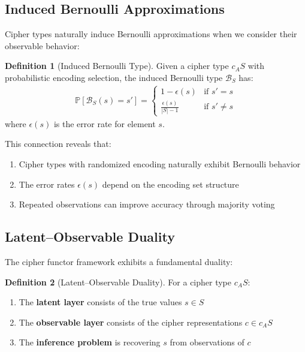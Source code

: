 \documentclass[11pt]{article}
\theoremstyle{definition}
\newtheorem{definition}{Definition}[section]
\theoremstyle{plain}
\theoremstyle{remark}
\newcommand{\cipher}[1]{c_{#1}}
\newcommand{\Bernoulli}{\mathcal{B}}
\newcommand{\Prob}{\mathbb{P}}
\begin{document}
\subsection{Induced Bernoulli Approximations}

Cipher types naturally induce Bernoulli approximations when we consider their observable behavior:

\begin{definition}[Induced Bernoulli Type]
\label{def:induced-bernoulli}
Given a cipher type $\cipher{A}S$ with probabilistic encoding selection, the induced Bernoulli type $\Bernoulli_S$ has:
\begin{align}
\Prob[\Bernoulli_S(s) = s'] = \begin{cases}
1 - \epsilon(s) & \text{if } s' = s\\
\frac{\epsilon(s)}{|S| - 1} & \text{if } s' \neq s
\end{cases}
\end{align}
where $\epsilon(s)$ is the error rate for element $s$.
\end{definition}

This connection reveals that:
\begin{enumerate}
\item Cipher types with randomized encoding naturally exhibit Bernoulli behavior
\item The error rates $\epsilon(s)$ depend on the encoding set structure
\item Repeated observations can improve accuracy through majority voting
\end{enumerate}

\subsection{Latent--Observable Duality}

The cipher functor framework exhibits a fundamental duality:

\begin{definition}[Latent--Observable Duality]
For a cipher type $\cipher{A}S$:
\begin{enumerate}
\item The \textbf{latent layer} consists of the true values $s \in S$
\item The \textbf{observable layer} consists of the cipher representations $c \in \cipher{A}S$
\item The \textbf{inference problem} is recovering $s$ from observations of $c$
\end{enumerate}
\end{definition}
\end{document}
